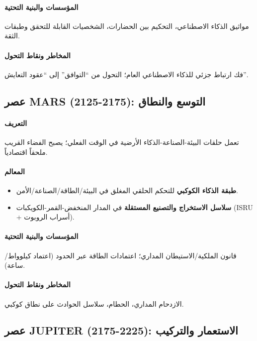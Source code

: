 \documentclass[11pt]{article}
\begin{document}
\paragraph{المؤسسات والبنية التحتية} مواثيق الذكاء الاصطناعي، التحكيم بين الحضارات، الشخصيات القابلة للتحقق وطبقات الثقة.

\paragraph{المخاطر ونقاط التحول} فك ارتباط جزئي للذكاء الاصطناعي العام؛ التحول من ``التوافق'' إلى ``عقود التعايش''.

\subsection{عصر MARS (2125-2175): التوسع والنطاق}
\paragraph{التعريف} تعمل حلقات البيئة-الصناعة-الذكاء الأرضية في الوقت الفعلي؛ يصبح الفضاء القريب ملحقاً اقتصادياً.

\paragraph{المعالم}
\begin{itemize}[noitemsep]
  \item \textbf{طبقة الذكاء الكوكبي} للتحكم الحلقي المغلق في البيئة/الطاقة/الصناعة/الأمن.
  \item \textbf{سلاسل الاستخراج والتصنيع المستقلة} في المدار المنخفض-القمر-الكويكبات (ISRU + أسراب الروبوت).
\end{itemize}

\paragraph{المؤسسات والبنية التحتية} قانون الملكية/الاستيطان المداري؛ اعتمادات الطاقة عبر الحدود (اعتماد كيلوواط/ساعة).

\paragraph{المخاطر ونقاط التحول} الازدحام المداري، الحطام، سلاسل الحوادث على نطاق كوكبي.

\subsection{عصر JUPITER (2175-2225): الاستعمار والتركيب}
\end{document}
